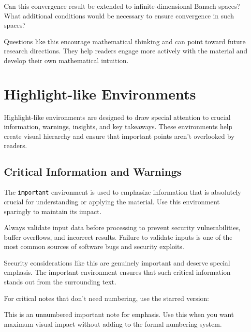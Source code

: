 \documentclass[9pt]{amsart}
\begin{document}
\begin{question}
	Can this convergence result be extended to infinite-dimensional Banach spaces? What additional conditions would be necessary to ensure convergence in such spaces?
\end{question}

Questions like this encourage mathematical thinking and can point toward future
research directions. They help readers engage more actively with the material
and develop their own mathematical intuition.

\section{Highlight-like Environments}

Highlight-like environments are designed to draw special attention to crucial
information, warnings, insights, and key takeaways. These environments help
create visual hierarchy and ensure that important points aren't overlooked by
readers.

\subsection{Critical Information and Warnings}

The \texttt{important} environment is used to emphasize information that is
absolutely crucial for understanding or applying the material. Use this
environment sparingly to maintain its impact.

\begin{important}
	Always validate input data before processing to prevent security vulnerabilities, buffer overflows, and incorrect results. Failure to validate inputs is one of the most common sources of software bugs and security exploits.
\end{important}

Security considerations like this are genuinely important and deserve special
emphasis. The important environment ensures that such critical information
stands out from the surrounding text.

For critical notes that don't need numbering, use the starred version:

\begin{important*}
	This is an unnumbered important note for emphasis. Use this when you want maximum visual impact without adding to the formal numbering system.
\end{important*}
\end{document}
